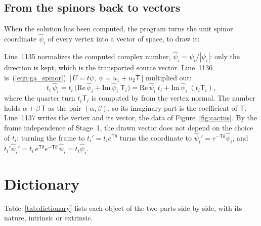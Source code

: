 \subsection{From the spinors back to vectors}
\label{section:r2_back}

When the solution has been computed, the program turns the unit spinor coordinate $\hat\psi_i$ of every vertex into a vector of space, to draw it:

Line~1135 normalizes the computed complex number, $\hat\psi_i = \psi_i/|\psi_i|$: only the direction is kept, which is the transported source vector. Line~1136 is~(\ref{eqn:ga_spinor})~[\,$U = t\psi,\ \psi = u_1 + u_2\mathsf T$\,] multiplied out:
\begin{equation*}
t_i\,\hat\psi_i = t_i\,\big(\mathrm{Re}\,\hat\psi_i + \mathrm{Im}\,\hat\psi_i\;\mathsf T_i\big) = \mathrm{Re}\,\hat\psi_i\; t_i + \mathrm{Im}\,\hat\psi_i\; (t_i\mathsf T_i) ,
\end{equation*}
where the quarter turn $t_i\mathsf T_i$ is computed by  from the vertex normal. The  number holds $\alpha + \beta\,\mathsf T$ as the pair $(\alpha, \beta)$, so its imaginary part is the coefficient of $\mathsf T$. Line~1137 writes the vertex and its vector, the data of Figure~\ref{fig:cactus}. By the frame independence of Stage~1, the drawn vector does not depend on the choice of $t_i$: turning the frame to $t_i' = t_i e^{\mathsf T\theta}$ turns the coordinate to $\hat\psi_i' = e^{-\mathsf T\theta}\hat\psi_i$, and $t_i'\hat\psi_i' = t_i\, e^{\mathsf T\theta}e^{-\mathsf T\theta}\,\hat\psi_i = t_i\hat\psi_i$.

\section{Dictionary}
\label{section:ga_dictionary}

Table~\ref{tab:dictionary} lists each object of the two parts side by side, with its nature, intrinsic or extrinsic.

